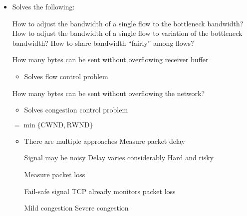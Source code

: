 \begin{itemize}
\begin{itemize}
\begin{itemize}
                \end{itemize}
        \end{itemize}
    \item Solves the following:
        \begin{itemize}
             How to adjust the bandwidth of a single flow to the bottleneck bandwidth?
             How to adjust the bandwidth of a single flow to variation of the bottleneck bandwidth?
             How to share bandwidth ``fairly'' among flows?
        \end{itemize}
        \begin{itemize}
             How many bytes can be sent without overflowing receiver buffer
                \begin{itemize}
                    \item Solves flow control problem
                \end{itemize}
             How many bytes can be sent without overflowing the network?
                \begin{itemize}
                    \item Solves congestion control problem
                \end{itemize}
             $= \min \{\text{CWND}, \text{RWND}\}$
        \end{itemize}
        \begin{itemize}
            \item There are multiple approaches
             Measure packet delay
                \begin{itemize}
                    \icon Signal may be noisy
                    \icon Delay varies considerably
                    \icon Hard and risky
                \end{itemize}
             Measure packet loss
                \begin{itemize}
                    \ipro Fail-safe signal
                    \ipro TCP already monitors packet loss
                        \begin{itemize}
                             Mild congestion
                             Severe congestion
                        \end{itemize}
                \end{itemize}

\end{itemize}
\end{itemize}
